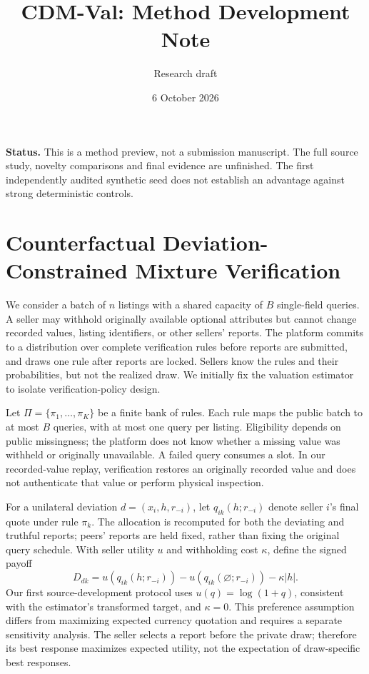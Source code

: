\documentclass[10pt]{article}
\title{CDM-Val: Method Development Note}
\author{Research draft}
\date{6 October 2026}
\begin{document}
\maketitle
\noindent\textbf{Status.} This is a method preview, not a submission manuscript.
The full source study, novelty comparisons and final evidence are unfinished.
The first independently audited synthetic seed does not establish an advantage
against strong deterministic controls.
\section{Counterfactual Deviation-Constrained Mixture Verification}
\label{sec:cdm-candidate}

We consider a batch of $n$ listings with a shared capacity of $B$ single-field
queries. A seller may withhold originally available optional attributes but
cannot change recorded values, listing identifiers, or other sellers' reports.
The platform commits to a distribution over complete verification rules before
reports are submitted, and draws one rule after reports are locked. Sellers
know the rules and their probabilities, but not the realized draw. We initially
fix the valuation estimator to isolate verification-policy design.

Let $\Pi=\{\pi_1,\ldots,\pi_K\}$ be a finite bank of rules. Each rule maps the
public batch to at most $B$ queries, with at most one query per listing.
Eligibility depends on public missingness; the platform does not know whether
a missing value was withheld or originally unavailable. A failed query consumes
a slot. In our recorded-value replay, verification restores an originally
recorded value and does not authenticate that value or perform physical
inspection.

For a unilateral deviation $d=(x_i,h,r_{-i})$, let
$q_{ik}(h;r_{-i})$ denote seller $i$'s final quote under rule $\pi_k$. The
allocation is recomputed for both the deviating and truthful reports; peers'
reports are held fixed, rather than fixing the original query schedule. With
seller utility $u$ and withholding cost $\kappa$, define the signed payoff
\begin{equation}
D_{dk}=u\!\left(q_{ik}(h;r_{-i})\right)
       -u\!\left(q_{ik}(\varnothing;r_{-i})\right)-\kappa|h|.
\end{equation}
Our first source-development protocol uses $u(q)=\log(1+q)$, consistent with
the estimator's transformed target, and $\kappa=0$. This preference assumption
differs from maximizing expected currency quotation and requires a separate
sensitivity analysis. The seller selects a report before the private draw;
therefore its best response maximizes expected utility, not the expectation of
draw-specific best responses.
\end{document}
